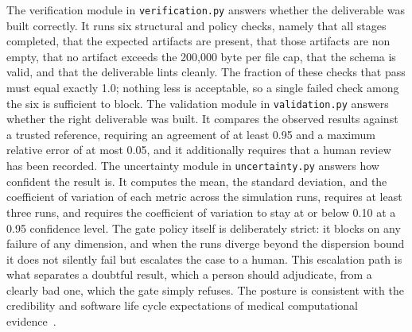 The verification module in \texttt{verification.py} answers whether the
deliverable was built correctly. It runs six structural and policy checks, namely
that all stages completed, that the expected artifacts are present, that those
artifacts are non empty, that no artifact exceeds the 200{,}000 byte per file
cap, that the schema is valid, and that the deliverable lints cleanly. The
fraction of these checks that pass must equal exactly 1.0; nothing less is
acceptable, so a single failed check among the six is sufficient to block. The
validation module in \texttt{validation.py} answers whether the right deliverable
was built. It compares the observed results against a trusted reference,
requiring an agreement of at least 0.95 and a maximum relative error of at most
0.05, and it additionally requires that a human review has been recorded. The
uncertainty module in \texttt{uncertainty.py} answers how confident the result
is. It computes the mean, the standard deviation, and the coefficient of
variation of each metric across the simulation runs, requires at least three
runs, and requires the coefficient of variation to stay at or below 0.10 at a
0.95 confidence level. The gate policy itself is deliberately strict: it blocks
on any failure of any dimension, and when the runs diverge beyond the dispersion
bound it does not silently fail but escalates the case to a human. This
escalation path is what separates a doubtful result, which a person should
adjudicate, from a clearly bad one, which the gate simply refuses. The posture is
consistent with the credibility and software life cycle expectations of medical
computational evidence~\cite{iec62304, iche6r3}.

